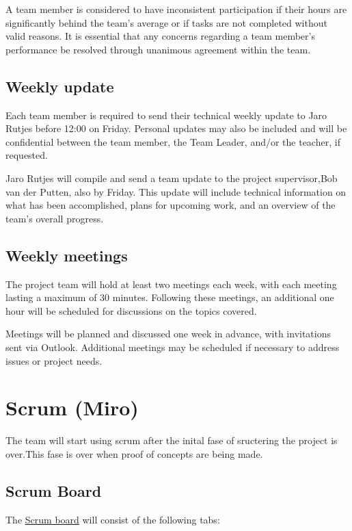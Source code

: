 \documentclass{projdoc}
\begin{document}
A team member is considered to have inconsistent participation if their hours 
are significantly behind the team’s average or if tasks are not completed 
without valid reasons. It is essential that any concerns regarding a team 
member's performance be resolved through unanimous agreement within the team.


\subsection{Weekly update}
Each team member is required to send their technical weekly update to Jaro 
Rutjes before 12:00 on Friday. Personal updates may also be included and will be
 confidential between the team member, the Team Leader, and/or the teacher, if 
 requested.

Jaro Rutjes will compile and send a team update to the project supervisor,Bob 
van der Putten, also by Friday. This update will include technical information 
on what has been accomplished, plans for upcoming work, and an overview of the 
team's overall progress.

\subsection{Weekly meetings}
The project team will hold at least two meetings each week, with each meeting 
lasting a maximum of 30 minutes. Following these meetings, an additional one 
hour will be scheduled for discussions on the topics covered.

Meetings will be planned and discussed one week in advance, with invitations 
sent via Outlook. Additional meetings may be scheduled if necessary to address 
issues or project needs.

\newpage

\section{Scrum (Miro)}

The team will start using scrum after the inital fase of sructering the project is over.This fase is over when proof of concepts are being made.

\subsection{Scrum Board}
The \href{https://miro.com/app/board/uXjVKjtdM64=/?share_link_id=303851465474}{Scrum board} will consist of the following tabs:
\end{document}
